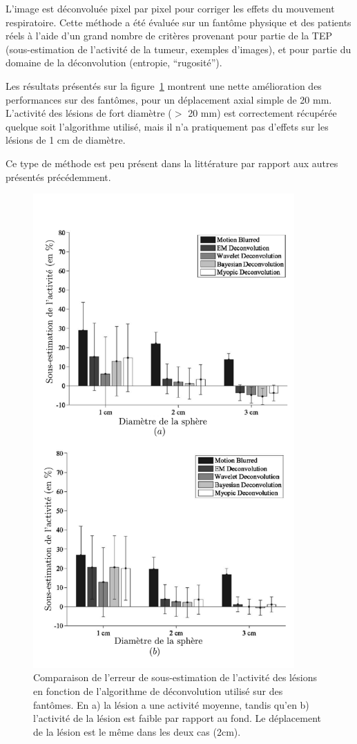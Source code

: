 L'image est déconvoluée pixel par pixel pour corriger les effets du mouvement respiratoire. Cette méthode a été évaluée sur un fantôme physique et des patients réels à l'aide d'un grand nombre de critères provenant pour partie de la TEP (sous-estimation de l'activité de la tumeur, exemples d'images), et pour partie du domaine de la déconvolution (entropie, ``rugosité'').

Les résultats présentés sur la figure~\ref{fig:performanceDeconvolution} montrent une nette amélioration des performances sur des fantômes, pour un déplacement axial simple de 20 mm. L'activité des lésions de fort diamètre ($>$ 20 mm) est correctement récupérée quelque soit l'algorithme utilisé, mais il n'a pratiquement pas d'effets sur les lésions de 1 cm de diamètre.

Ce type de méthode est peu présent dans la littérature par rapport aux autres présentés précédemment. 

\begin{figure}[h!]
	\begin{center}
		\includegraphics[width=10cm]{images/performanceDeconvolution}
	\end{center}
	\caption[Comparaison de l'erreur de sous-estimation de l'activité des lésions]{Comparaison de l'erreur de sous-estimation de l'activité des lésions en fonction de l'algorithme de déconvolution utilisé sur des fantômes. En a) la lésion a une activité moyenne, tandis qu'en b) l'activité de la lésion est faible par rapport au fond. Le déplacement de la lésion est le même dans les deux cas (2cm).} 
	\label{fig:performanceDeconvolution}
\end{figure}


